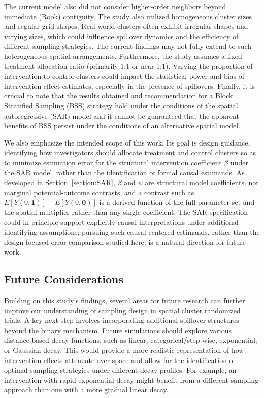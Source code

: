 \documentclass{article}[11pt]
\begin{document}
The current model also did not consider higher-order neighbors beyond immediate (Rook) contiguity. The study also utilized homogeneous cluster sizes and regular grid shapes. Real-world clusters often exhibit irregular shapes and varying sizes, which could influence spillover dynamics and the efficiency of different sampling strategies. The current findings may not fully extend to such heterogeneous spatial arrangements. Furthermore, the study assumes a fixed treatment allocation ratio (primarily 1:1 or near 1:1). Varying the proportion of intervention to control clusters could impact the statistical power and bias of intervention effect estimates, especially in the presence of spillovers. Finally, it is crucial to note that the results obtained and recommendation for a Block Stratified Sampling (BSS) strategy hold under the conditions of the spatial autoregressive (SAR) model and it cannot be guaranteed that the apparent benefits of BSS persist under the conditions of an alternative spatial model.

We also emphasize the intended scope of this work. Its goal is design guidance, identifying how investigators should allocate treatment and control clusters so as to minimize estimation error for the structural intervention coefficient $\beta$ under the SAR model, rather than the identification of formal causal estimands. As developed in Section~\ref{section:SAR}, $\beta$ and $\psi$ are structural model coefficients, not marginal potential-outcome contrasts, and a contrast such as $E[Y(0,\mathbf{1})] - E[Y(0,\mathbf{0})]$ is a derived function of the full parameter set and the spatial multiplier rather than any single coefficient. The SAR specification could in principle support explicitly causal interpretations under additional identifying assumptions; pursuing such causal-centered estimands, rather than the design-focused error comparison studied here, is a natural direction for future work.

\subsection{Future Considerations}\label{section:FutureConsiderations}

Building on this study's findings, several areas for future research can further improve our
understanding of sampling design in spatial cluster randomized trials. A key next step involves incorporating additional spillover structures beyond the binary mechanism. Future simulations should explore various distance-based decay functions, such
as linear, categorical/step-wise, exponential, or Gaussian decay. This would provide a more
realistic representation of how intervention effects attenuate over space and allow for the
identification of optimal sampling strategies under different decay profiles. For example, an
intervention with rapid exponential decay might benefit from a different sampling approach
than one with a more gradual linear decay.
\end{document}

